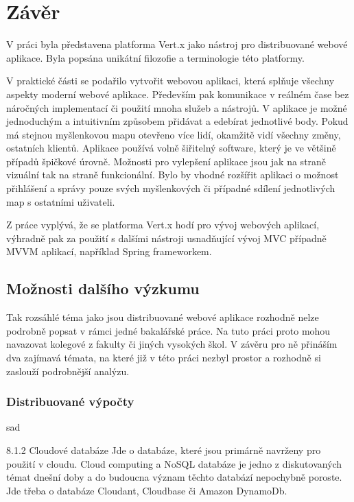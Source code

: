 
\chapter[Závěr]{Závěr}

V práci byla představena platforma Vert.x jako nástroj pro distribuované webové aplikace. Byla popsána unikátní filozofie a terminologie této platformy.

V praktické části se podařilo vytvořit webovou aplikaci, která splňuje všechny aspekty moderní webové aplikace. Především pak komunikace v reálném čase bez náročných implementací či použití mnoha služeb a nástrojů. V aplikace je možné jednoduchým a intuitivním způsobem přidávat a edebírat jednotlivé body. Pokud má stejnou myšlenkovou mapu otevřeno více lidí, okamžitě vidí všechny změny, ostatních klientů. Aplikace používá volně šiřitelný software, který je ve většině případů špičkové úrovně. %
Možnosti pro vylepšení aplikace jsou jak na straně vizuální tak na straně funkcionální. Bylo by vhodné rozšířit aplikaci o možnost přihlášení a správy pouze svých myšlenkových či případné sdílení jednotlivých map s ostatními uživateli.

 
Z práce vyplývá, že se platforma Vert.x hodí pro vývoj webových aplikací, výhradně pak za použití s dalšími nástroji usnadňující vývoj MVC případně MVVM aplikací, například Spring frameworkem.

\section{Možnosti dalšího výzkumu}

Tak rozsáhlé téma jako jsou distribuované webové aplikace rozhodně nelze podrobně popsat v rámci 
jedné bakalářské práce. Na tuto práci proto mohou navazovat kolegové z fakulty či jiných 
vysokých škol. V závěru pro ně přináším dva zajímavá témata, na které již v této práci 
nezbyl prostor a rozhodně si zaslouží podrobnější analýzu.
 
\subsection{Distribuované výpočty}

sad
 
8.1.2 Cloudové databáze 
Jde o databáze, které jsou primárně navrženy pro použití v cloudu. Cloud computing a 
NoSQL databáze je jedno z diskutovaných témat dnešní doby a do budoucna význam těchto 
databází nepochybně poroste. Jde třeba o databáze Cloudant, Cloudbase či Amazon 
DynamoDb. 
